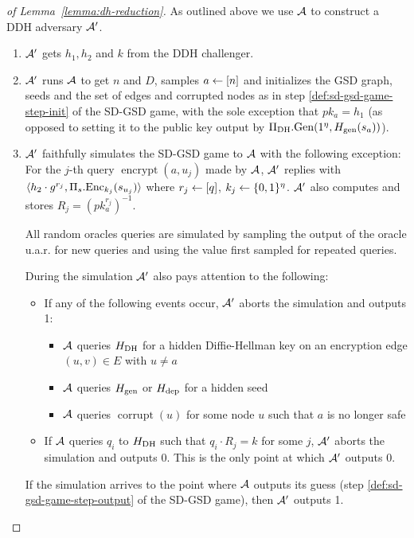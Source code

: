 \begin{proof}[of Lemma~\ref{lemma:dh-reduction}]
	As outlined above we use $\mathcal{A}$ to construct a DDH adversary $\mathcal{A}'$.
	\begin{enumerate}[1.]
		\item $\mathcal{A}'$ gets $h_1, h_2$ and $k$ from the DDH challenger.
		\item $\mathcal{A}'$ runs $\mathcal{A}$ to get $n$ and $D$, samples $a \leftarrow [n]$ and initializes the GSD graph, seeds and the set of edges and corrupted nodes as in step \ref{def:sd-gsd-game-step-init} of the SD-GSD game, with the sole exception that $pk_a = h_1$ (as opposed to setting it to the public key output by $\Pi_{\mathrm{DH}}.\mathrm{Gen}(1^\eta, H_\mathrm{gen}(s_a))$).
		\item $\mathcal{A}'$ faithfully simulates the SD-GSD game to $\mathcal{A}$ with the following exception: For the $j$-th query $\operatorname{encrypt}(a, u_j)$ made by $\mathcal{A}$, $\mathcal{A}'$ replies with $\langle h_2 \cdot g^{r_j}, \Pi_s.\mathrm{Enc}_{k_j}(s_{u_j}) \rangle$ where $r_j \leftarrow [q]$, $k_j \leftarrow \{0, 1\}^\eta$. $\mathcal{A}'$ also computes and stores $R_j = \left(pk_a^{r_j}\right)^{-1}$.

		      All random oracles queries are simulated by sampling the output of the oracle u.a.r. for new queries and using the value first sampled for repeated queries.

		      During the simulation $\mathcal{A}'$ also pays attention to the following:
		      \begin{itemize}
			      \item If any of the following events occur, $\mathcal{A}'$ aborts the simulation and outputs 1:
			            \begin{itemize}
				            \item $\mathcal{A}$ queries $H_\mathrm{DH}$ for a hidden Diffie-Hellman key on an encryption edge $(u, v) \in E$ with $u \neq a$
				            \item $\mathcal{A}$ queries $H_\mathrm{gen}$ or $H_\mathrm{dep}$ for a hidden seed
				            \item $\mathcal{A}$ queries $\operatorname{corrupt}(u)$ for some node $u$ such that $a$ is no longer safe
			            \end{itemize}
			      \item If $\mathcal{A}$ queries $q_i$ to $H_\mathrm{DH}$ such that $q_i \cdot R_j = k$ for some $j$, $\mathcal{A}'$ aborts the simulation and outputs 0. This is the only point at which $\mathcal{A}'$ outputs 0.
		      \end{itemize}

		      If the simulation arrives to the point where $\mathcal{A}$ outputs its guess (step \ref{def:sd-gsd-game-step-output} of the SD-GSD game), then $\mathcal{A}'$ outputs 1.
	\end{enumerate}


\end{proof}
